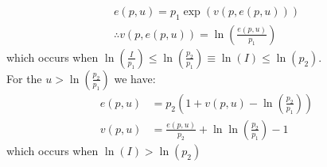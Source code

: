 \documentclass{article}
\begin{document}
\begin{itemize}
\begin{itemize}
    \begin{align*}
      e(p,u) = p_{1}\exp (v(p,e(p,u))) \\
      \therefore v(p,e(p,u)) = \ln (\frac{e(p,u)}{p_{1}})
    \end{align*}
    which occurs when $\ln(\tfrac{I}{p_{1}}) \leq \ln (\tfrac{p_{2}}{p_{1}}) \equiv \ln(I) \leq \ln(p_{2})$. \\ For the $u > \ln (\tfrac{p_{2}}{p_{1}})$ we have:
    \begin{align*}
      e(p,u) &= p_{2}(1 + v(p,u) - \ln (\frac{p_{2}}{p_{1}})) \\
      v(p,u) &= \frac{e(p,u)}{p_{2}} + \ln \ln (\frac{p_{2}}{p_{1}}) - 1
    \end{align*}
    which occurs when $\ln (I) > \ln (p_{2})$
  \end{itemize}
\end{itemize}
\par
\vspace{6mm}
\end{document}
